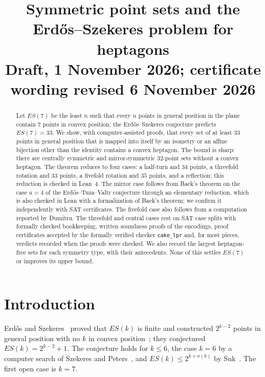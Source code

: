 \documentclass[11pt]{article}
\title{Symmetric point sets and the Erd\H{o}s--Szekeres problem for heptagons\\[2pt]\large Draft, 1 November 2026; certificate wording revised 6 November 2026}
\author{}
\date{}
\theoremstyle{remark}
\begin{document}
\maketitle

\begin{abstract}
Let $ES(7)$ be the least $n$ such that every $n$ points in general position in the plane contain $7$ points in convex
position; the Erd\H{o}s--Szekeres conjecture predicts $ES(7)=33$. We show, with computer-assisted proofs, that every set
of at least $33$ points in general position that is mapped into itself by an isometry or an affine bijection other than
the identity contains a convex heptagon. The bound is sharp: there are centrally symmetric and mirror-symmetric
$32$-point sets without a convex heptagon. The theorem reduces to four cases: a half-turn and $34$ points, a threefold
rotation and $33$ points, a fivefold rotation and $35$ points, and a reflection; this reduction is checked in Lean~4.
The mirror case follows from Baek's theorem on the case $a=4$ of the Erd\H{o}s--Tuza--Valtr conjecture through an
elementary reduction, which is also checked in Lean with a formalization of Baek's theorem; we confirm it independently
with SAT certificates. The fivefold case also follows from a computation reported by Dumitru. The threefold and central
cases rest on SAT case splits with formally checked bookkeeping, written soundness proofs of the encodings, proof
certificates accepted by the formally verified checker \texttt{cake\_lpr} and, for most pieces, verdicts recorded when the proofs were checked. We also
record the largest heptagon-free sets for each symmetry type, with their antecedents. None of this settles $ES(7)$ or
improves its upper bound.
\end{abstract}

\section{Introduction}
Erd\H{o}s and Szekeres~\cite{ES35} proved that $ES(k)$ is finite and constructed $2^{k-2}$ points in general position with
no $k$ in convex position~\cite{ES61}; they conjectured $ES(k)=2^{k-2}+1$. The conjecture holds for $k\le 6$, the case
$k=6$ by a computer search of Szekeres and Peters~\cite{SP06}, and $ES(k)\le 2^{k+o(k)}$ by Suk~\cite{Suk17}. The first
open case is $k=7$.
\end{document}
